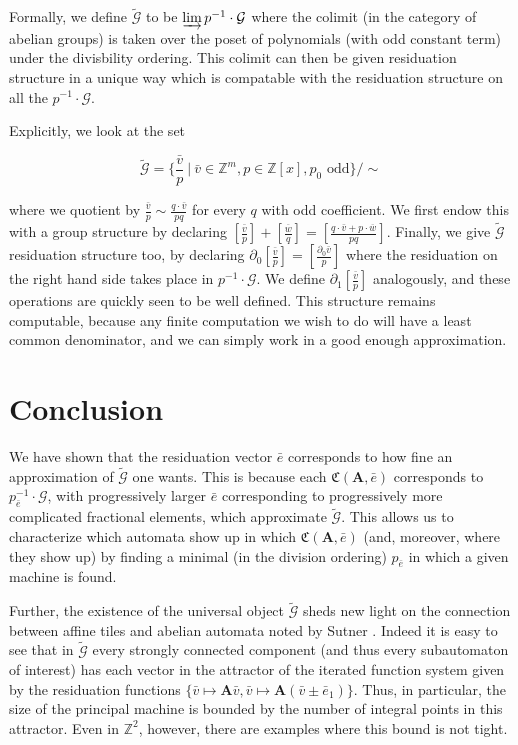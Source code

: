 \documentclass[runningheads]{llncs}
\newcommand{\G}{\mathcal{G}}
\newcommand{\C}{\mathfrak{C}(\Am,\e)}
\newcommand{\Z}{\mathbb{Z}}
\newcommand{\2}{\textbf{2}}
\newcommand{\Am}{\textbf{A}}
\newcommand{\del}{\partial}
\newcommand{\vv}{\bar{v}}
\newcommand{\e}{\bar{e}}
\begin{document}
Formally, we define $\widetilde{\G}$ to be $\varinjlim p^{-1} \cdot \G$ 
where the colimit (in the category of abelian groups) is taken over the poset 
of polynomials (with odd constant term) under the divisbility ordering. This 
colimit can then be given residuation structure in a unique way which is 
compatable with the residuation structure on all the $p^{-1} \cdot \G$.

Explicitly, we look at the set 

\[ 
  \widetilde{\G} = \{ \frac{\vv}{p} ~|~ \vv \in \Z^m, p \in \Z[x], p_0 \text{ odd} \} / \sim
\]

where we quotient by $\frac{\vv}{p} \sim \frac{q \cdot \vv}{pq}$ for every
$q$ with odd coefficient. We first endow this with a group structure by
declaring $[\frac{\vv}{p}] + [\frac{\overline{w}}{q}] = 
[\frac{q \cdot \vv + p \cdot \overline{w}}{pq}]$. Finally, we give
$\widetilde{\G}$ residuation structure too, by declaring 
$\del_0 [\frac{\vv}{p}] = [\frac{\del_0 \vv}{p}]$ where the residuation
on the right hand side takes place in $p^{-1} \cdot \G$. We define 
$\del_1 [\frac{\vv}{p}]$ analogously, and these operations are quickly seen
to be well defined.  This structure remains computable, because any finite 
computation we wish to do will have a least common denominator, and we can
simply work in a good enough approximation.

\section{Conclusion}
We have shown that the residuation vector $\e$ corresponds to how fine an
approximation of $\widetilde{\G}$ one wants. This is because each $\C$ 
corresponds to $p_{\e}^{-1} \cdot \G$, with progressively larger $\e$ 
corresponding to progressively more complicated fractional elements, which
approximate $\widetilde{\G}$. This allows us to characterize which automata
show up in which $\C$ (and, moreover, where they show up) by finding a minimal 
(in the division ordering) $p_{\e}$ in which a given machine is found.

Further, the existence of the universal object $\widetilde{\G}$ 
sheds new light on the connection between affine tiles
\cite{LagariasWang96:tiles,LagariasWang97:integral_tiles}
and abelian automata noted by Sutner
\cite{Sutner18:abelian_automata}. 
Indeed it is easy to see that in 
$\widetilde{\G}$ every strongly connected component 
(and thus every subautomaton of interest) has each vector in the attractor 
of the iterated function system given by the residuation functions 
$\{ \vv \mapsto \Am \vv, \vv \mapsto \Am (\vv \pm \e_1) \}$.
Thus, in particular, the size of the principal machine is bounded by the
number of integral points in this attractor. Even in $\Z^2$, however, there
are examples where this bound is not tight.
\end{document}
